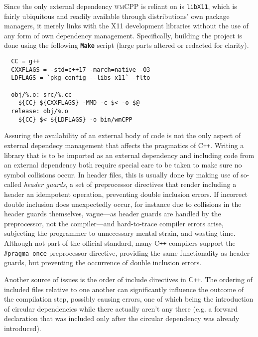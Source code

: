 Since   the  only   external  dependency   \textsc{wmCPP}  is   reliant  on   is
\texttt{libX11},  which  is  fairly  ubiquitous and  readily  available  through
distributions'   own  package   managers,   it  merely   links   with  the   X11
development  libraries   without  the  use   of  any  form  of   own  dependency
management.  Specifically, building  the  project is  done  using the  following
\textbf{\texttt{Make}} script (large parts altered or redacted for clarity).

\begin{verbatim}
  CC = g++
  CXXFLAGS = -std=c++17 -march=native -O3
  LDFLAGS = `pkg-config --libs x11` -flto

  obj/%.o: src/%.cc
    ${CC} ${CXXFLAGS} -MMD -c $< -o $@
  release: obj/%.o
    ${CC} $< ${LDFLAGS} -o bin/wmCPP
\end{verbatim}

Assuring the availability of an external body  of code is not the only aspect of
external  dependecy  management that  affects  the  pragmatics of  C\texttt{++}.
Writing a library that is to be imported as an external dependency and including
code from an external  dependency both require special care to  be taken to make
sure no symbol collisions occur. In header files, this is usually done by making
use of so-called  \textit{header guards}, a set of  preprocessor directives that
render including a  header an idempotent operation,  preventing double inclusion
errors. If incorrect double inclusion  does unexpectedly occur, for instance due
to  collisions in  the header  guards themselves,  vague---as header  guards are
handled  by  the preprocessor,  not  the  compiler---and hard-to-trace  compiler
errors  arise,  subjecting the  programmer  to  unnecessary mental  strain,  and
wasting  time. Although  not part  of the  official standard,  many C\texttt{++}
compilers  support the  \texttt{#pragma once}  preprocessor  directive,
providing the same functionality as header guards, but preventing the occurrence
of double inclusion errors.

Another source of issues is the order of include directives in C\texttt{++}. The
ordering of included  files relative to one another  can significantly influence
the outcome of the compilation step, possibly causing errors, one of which being
the introduction of circular dependencies  while there actually aren't any there
(e.g. a forward declaration that was included only after the circular dependency
was already introduced).\\

